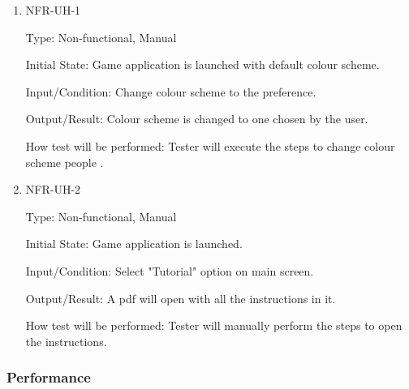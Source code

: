 \documentclass[12pt, titlepage]{article}
\begin{document}
\begin{enumerate}

\item{NFR-UH-1\\}

Type: Non-functional, Manual
					
Initial State: Game application is launched with default colour scheme.
					
Input/Condition: Change colour scheme to the preference.
					
Output/Result: Colour scheme is changed to one chosen by the user.
					
How test will be performed: Tester will execute the steps to change colour scheme people .

\item{NFR-UH-2\\}

Type: Non-functional, Manual
					
Initial State: Game application is launched.
					
Input/Condition: Select "Tutorial" option on main screen.
					
Output/Result: A pdf will open with all the instructions in it.
					
How test will be performed: Tester will manually perform the steps to open the instructions.

\end{enumerate}

\subsubsection{Performance}
\end{document}
